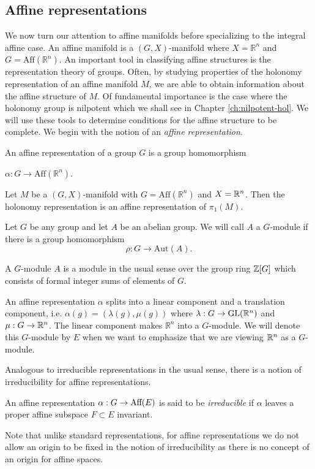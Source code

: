\subsection{Affine representations}
We now turn our attention to affine manifolds before specializing to the
integral affine case. An affine manifold is a $(G,X)$-manifold where $X =
    \mathbb{R}^n$ and $G = \text{Aff}(\mathbb{R}^n)$. An important tool in
classifying affine structures is the representation theory of groups. Often, by
studying properties of the holonomy representation of an affine manifold $M$,
we are able to obtain information about the affine structure of $M$. Of
fundamental importance is the case where the holonomy group is nilpotent which
we shall see in Chapter \ref{ch:nilpotent-hol}. We will use these tools to
determine conditions for the affine structure to be complete. We begin with the
notion of an \emph{affine representation}.

\begin{definition}
    An affine representation of a group $G$ is a group homomorphism
    \begin{center}
        $\alpha: G \to \text{Aff}(\mathbb{R}^n)$.
    \end{center}
\end{definition}

\begin{eg}
    Let $M$ be a $(G,X)$-manifold with $G = \text{Aff}(\mathbb{R}^n)$ and $X = \mathbb{R}^n$. Then the holonomy representation
    is an affine representation of $\pi_1(M)$.
\end{eg}
\begin{definition}
    Let $G$ be any group and let $A$ be an abelian group. We will call $A$ a $G$-module if there is a group homomorphism
    $$\rho: G \to \text{Aut}(A).$$
\end{definition}
\begin{remark}
    A $G$-module $A$ is a module in the usual sense over the group ring $\mathbb{Z}[G]$ which consists of formal integer sums of elements of $G$.
\end{remark}
\begin{remark}
    An affine representation $\alpha$ splits into a linear component and a
    translation component, i.e. $\alpha(g) = (\lambda(g), \mu(g))$ where $\lambda:
        G \to \text{GL}(\mathbb{R}^n)$ and $\mu : G \to \mathbb{R}^n$. The linear component makes
    $\mathbb{R}^n$ into a $G$-module. We will denote this $G$-module by $E$ when we want to emphasize that we are viewing $\mathbb{R}^n$ as a $G$-module.
\end{remark}
Analogous to irreducible representations in the usual sense, there is a notion of irreducibility for affine representations.
\begin{definition}
    An affine representation $\alpha: G \to \text{Aff}(E)$ is said to be \emph{irreducible} if $\alpha$ leaves a proper affine subspace
    $F \subset E$ invariant.
\end{definition}
\begin{remark}
    Note that unlike standard representations, for affine representations we do not allow an origin to be fixed in the notion of irreducibility as
    there is no concept of an origin for affine spaces.
\end{remark}

